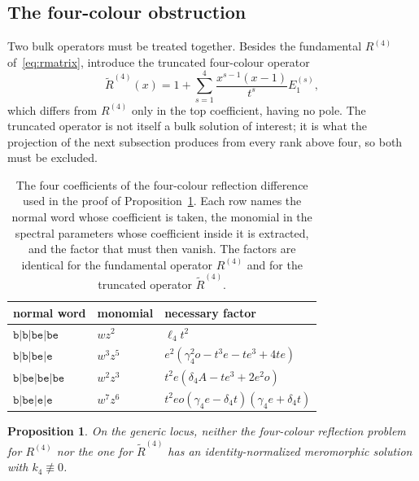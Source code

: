 \documentclass[
  aps,pre,
  reprint,
  superscriptaddress,
  amsmath,amssymb,
  floatfix
]{revtex4-2}
\theoremstyle{plain}
\newtheorem{proposition}[theorem]{Proposition}
\theoremstyle{definition}
\theoremstyle{remark}
\begin{document}
\subsection{The four-colour obstruction}

Two bulk operators must be treated together. Besides the fundamental
$R^{(4)}$ of~\eqref{eq:rmatrix}, introduce the truncated four-colour operator
\begin{equation}
  \widetilde R^{(4)}(x)
  =1+\sum_{s=1}^{4}\frac{x^{s-1}(x-1)}{t^s}E_1^{(s)} ,
  \label{eq:truncated-r4}
\end{equation}
which differs from $R^{(4)}$ only in the top coefficient, having no pole. The
truncated operator is not itself a bulk solution of interest; it is what the
projection of the next subsection produces from every rank above four, so both
must be excluded.

\begin{table}[htbp]
\caption{The four coefficients of the four-colour reflection difference used in
the proof of Proposition~\ref{prop:r4}. Each row names the normal word whose
coefficient is taken, the monomial in the spectral parameters whose coefficient
inside it is extracted, and the factor that must then vanish. The factors are
identical for the fundamental operator $R^{(4)}$ and for the truncated operator
$\widetilde R^{(4)}$.}
\label{tab:r4}
\begin{ruledtabular}
\begin{tabular}{lll}
normal word & monomial & necessary factor\\
\hline
$\mathtt{b|b|be|be}$ & $wz^2$ & $\ell_4 t^2$\\
$\mathtt{b|b|be|e}$ & $w^3z^5$ & $e^2(\gamma_4^2o-t^3e-te^3+4te)$\\
$\mathtt{b|be|be|be}$ & $w^2z^3$ & $t^2e(\delta_4A-te^3+2e^2o)$\\
$\mathtt{b|be|e|e}$ & $w^7z^6$ & $t^2eo(\gamma_4e-\delta_4t)(\gamma_4e+\delta_4t)$\\
\end{tabular}
\end{ruledtabular}
\end{table}

\begin{proposition}
\label{prop:r4}
On the generic locus, neither the four-colour reflection problem for $R^{(4)}$
nor the one for $\widetilde R^{(4)}$ has an identity-normalized meromorphic
solution with $k_4\not\equiv0$.
\end{proposition}
\end{document}
